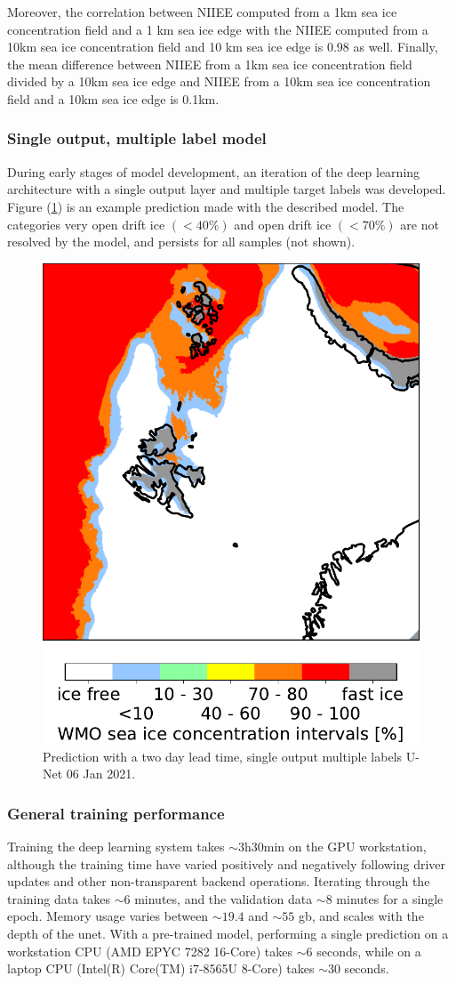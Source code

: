 \documentclass[../main/thesis]{subfiles}
\begin{document}
Moreover, the correlation between NIIEE computed from a 1km sea ice concentration field and a 1 km sea ice edge with the NIIEE computed from a 10km sea ice concentration field and 10 km sea ice edge is 0.98 as well. Finally, the mean difference between NIIEE from a 1km sea ice concentration field divided by a 10km sea ice edge and NIIEE from a 10km sea ice concentration field and a 10km sea ice edge is 0.1km.  

\subsubsection{Single output, multiple label model}
\label{sec:singleoutputmodel}
During early stages of model development, an iteration of the deep learning architecture with a single output layer and multiple target labels was developed. Figure (\ref{fig:singleoutmodel}) is an example prediction made with the described model. The categories very open drift ice $(<40\%)$ and open drift ice $(<70\%)$ are not resolved by the model, and persists for all samples (not shown). 

\begin{figure}
    \centering
    \includegraphics[width=.6\textwidth]{20210106}
    \caption{\label{fig:singleoutmodel}Prediction with a two day lead time, single output multiple labels U-Net 06 Jan 2021.}
\end{figure}

\subsubsection{General training performance}
Training the deep learning system takes $\sim 3\text{h}30\text{min}$ on the GPU workstation, although the training time have varied positively and negatively following driver updates and other non-transparent backend operations. Iterating through the training data takes $\sim 6$ minutes, and the validation data $\sim 8$ minutes for a single epoch. Memory usage varies between $\sim19.4$ and $\sim55$ gb, and scales with the depth of the unet. With a pre-trained model, performing a single prediction on a workstation CPU (AMD EPYC 7282 16-Core) takes $\sim 6$ seconds, while on a laptop CPU (Intel(R) Core(TM) i7-8565U 8-Core) takes $\sim 30$ seconds.
\end{document}
